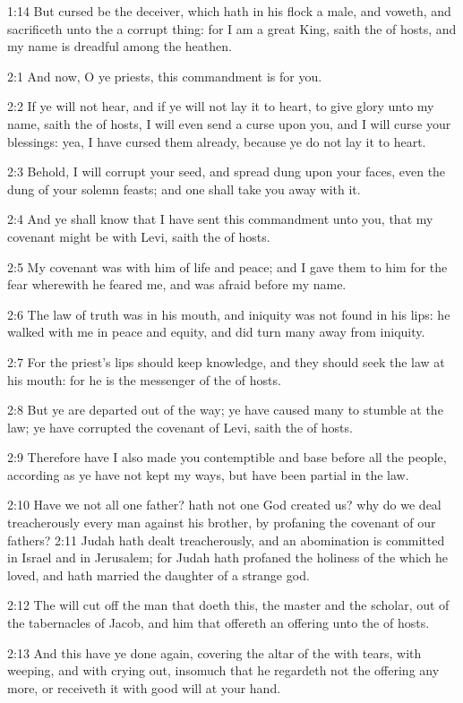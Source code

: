 1:14 But cursed be the deceiver, which hath in his flock a male, and
voweth, and sacrificeth unto the \LORD a corrupt thing: for I am a
great King, saith the \LORD of hosts, and my name is dreadful among the
heathen.

2:1 And now, O ye priests, this commandment is for you.

2:2 If ye will not hear, and if ye will not lay it to heart, to give
glory unto my name, saith the \LORD of hosts, I will even send a curse
upon you, and I will curse your blessings: yea, I have cursed them
already, because ye do not lay it to heart.

2:3 Behold, I will corrupt your seed, and spread dung upon your faces,
even the dung of your solemn feasts; and one shall take you away with
it.

2:4 And ye shall know that I have sent this commandment unto you, that
my covenant might be with Levi, saith the \LORD of hosts.

2:5 My covenant was with him of life and peace; and I gave them to him
for the fear wherewith he feared me, and was afraid before my name.

2:6 The law of truth was in his mouth, and iniquity was not found in
his lips: he walked with me in peace and equity, and did turn many
away from iniquity.

2:7 For the priest's lips should keep knowledge, and they should seek
the law at his mouth: for he is the messenger of the \LORD of hosts.

2:8 But ye are departed out of the way; ye have caused many to stumble
at the law; ye have corrupted the covenant of Levi, saith the \LORD of
hosts.

2:9 Therefore have I also made you contemptible and base before all
the people, according as ye have not kept my ways, but have been
partial in the law.

2:10 Have we not all one father? hath not one God created us? why do
we deal treacherously every man against his brother, by profaning the
covenant of our fathers?  2:11 Judah hath dealt treacherously, and an
abomination is committed in Israel and in Jerusalem; for Judah hath
profaned the holiness of the \LORD which he loved, and hath married the
daughter of a strange god.

2:12 The \LORD will cut off the man that doeth this, the master and the
scholar, out of the tabernacles of Jacob, and him that offereth an
offering unto the \LORD of hosts.

2:13 And this have ye done again, covering the altar of the \LORD with
tears, with weeping, and with crying out, insomuch that he regardeth
not the offering any more, or receiveth it with good will at your
hand.

